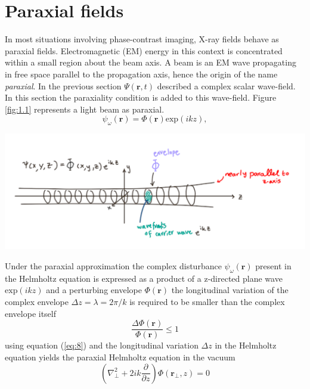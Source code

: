 \documentclass[10pt, a4paper, singlespacing]{report}
\newenvironment{Figure}
    {\par\medskip\noindent\minipage{\linewidth}}
    {\endminipage\par\medskip}
\begin{document}
\section{Paraxial fields}\label{Paraxial}
In most situations involving phase-contrast imaging, X-ray fields behave as paraxial fields. Electromagnetic (EM) energy in this context is concentrated within a small region about the beam axis. A beam is an EM wave propagating in free space parallel to the propagation axis, hence the origin of the name \textit{paraxial}.
In the previous section $\Psi(\mathbf{r},t)$ described a complex scalar wave-field. In this section the paraxiality condition is added to this wave-field. Figure \ref{fig:1.1} represents a light beam as paraxial.
\begin{equation}\label{eq:7}
\psi_{\omega}(\mathbf{r}) = \Phi(\mathbf{r})\mathrm{exp}(ikz),
\end{equation}
\begin{Figure}
\centering
\includegraphics[width=0.6\linewidth]{paraxial_beam.pdf}
\label{fig:1.1}
\end{Figure}
Under the paraxial approximation the complex disturbance $\psi_{\omega}(\mathbf{r})$ present in the Helmholtz equation is expressed as a product of a z-directed plane wave $\mathrm{exp}(ikz)$ and a perturbing envelope $\Phi(\mathbf{r})$\cite{PagsTutes}\cite{CH49}
the longitudinal variation of the complex envelope $\Delta z = \lambda = 2 \pi/k$ is required to be smaller than the complex envelope itself
\begin{equation}\label{eq:8}
\frac{\Delta \Phi(\mathbf{r})}{\Phi(\mathbf{r})} \leq 1
\end{equation}
using equation (\ref{eq:8}) and the longitudinal variation $\Delta z$  in the Helmholtz equation yields the paraxial Helmholtz equation in the vacuum
\begin{equation}\label{eq:9}
\left (\nabla_{\perp}^{2} + 2 i k \frac{\partial }{\partial z}\right ) \Phi(\mathbf{r}_{\perp}, z) = 0
\end{equation}
\end{document}
